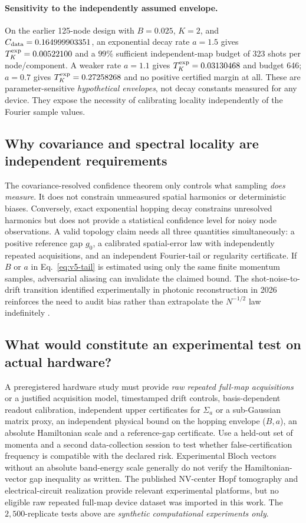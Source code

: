 \documentclass[aps,prd,onecolumn,notitlepage,11pt,superscriptaddress,longbibliography]{revtex4-2}
\begin{document}
\paragraph{Sensitivity to the independently assumed envelope.}
On the earlier 125-node design with $B=0.025$, $K=2$, and
$C_{\rm data}=0.164999903351$, an exponential decay rate $a=1.5$
gives $T_K^{\rm exp}=0.00522100$ and a $99\%$ sufficient independent-map
budget of 323 shots per node/component. A weaker rate $a=1.1$
gives $T_K^{\rm exp}=0.03130468$ and budget 646; $a=0.7$ gives
$T_K^{\rm exp}=0.27258268$ and no positive certified margin at all.
These are parameter-sensitive \emph{hypothetical envelopes}, not decay
constants measured for any device. They expose the necessity of
calibrating locality independently of the Fourier sample values.

\subsection{Why covariance and spectral locality are independent requirements}
The covariance-resolved confidence theorem only controls what sampling \emph{does measure}. It does not constrain unmeasured spatial harmonics or deterministic biases. Conversely, exact exponential hopping decay constrains unresolved harmonics but does not provide a statistical confidence level for noisy node observations. A valid topology claim needs all three quantities simultaneously: a positive reference gap $g_0$, a calibrated spatial-error law with independently repeated acquisitions, and an independent Fourier-tail or regularity certificate. If $B$ or $a$ in Eq.~\eqref{eq:v5-tail} is estimated using only the same finite momentum samples, adversarial aliasing can invalidate the claimed bound. The shot-noise-to-drift transition identified experimentally in photonic reconstruction in 2026 reinforces the need to audit bias rather than extrapolate the $N^{-1/2}$ law indefinitely \cite{Vattay2026}.

\subsection{What would constitute an experimental test on actual hardware?}
A preregistered hardware study must provide \emph{raw repeated full-map acquisitions} or a justified acquisition model, timestamped drift controls, basis-dependent readout calibration, independent upper certificates for $\Sigma_a$ or a sub-Gaussian matrix proxy, an independent physical bound on the hopping envelope ($B,a$), an absolute Hamiltonian scale and a reference-gap certificate. Use a held-out set of momenta and a second data-collection session to test whether false-certification frequency is compatible with the declared risk. Experimental Bloch vectors without an absolute band-energy scale generally do not verify the Hamiltonian-vector gap inequality as written. The published NV-center Hopf tomography \cite{Yuan2017} and electrical-circuit realization \cite{Wang2023} provide relevant experimental platforms, but no eligible raw repeated full-map device dataset was imported in this work. The $2{,}500$-replicate tests above are \emph{synthetic computational experiments only}.
\end{document}
